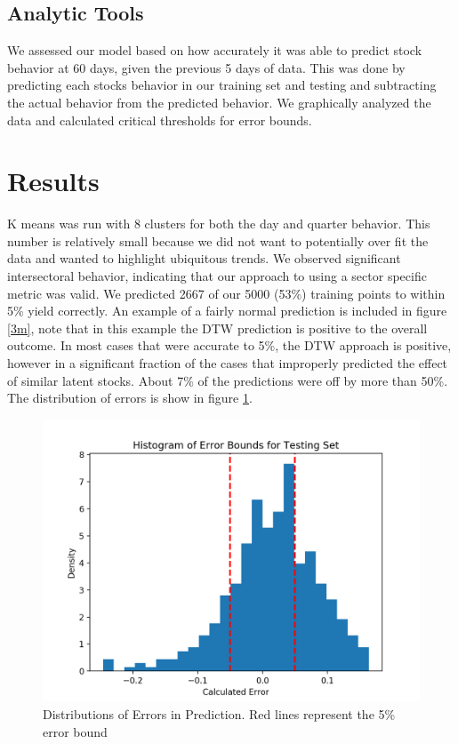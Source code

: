 \documentclass{article}
\begin{document}
\subsection{Analytic Tools}
We assessed our model based on how accurately it was able to predict stock behavior at 60 days, given the previous 5 days of data. This was done by predicting each stocks behavior in our training set and testing and subtracting the actual behavior from the predicted behavior. We graphically analyzed the data and calculated critical thresholds for error bounds. 

\section{Results}

K means was run with 8 clusters for both the day and quarter behavior. This number is relatively small because we did not want to potentially over fit the data and wanted to highlight ubiquitous trends. We observed significant intersectoral behavior, indicating that our approach to using a sector specific metric was valid. We predicted 2667 of our 5000 (53\%) training points   to within 5\% yield correctly. An example of a fairly normal prediction is included in figure \ref{3m}, note that in this example the DTW prediction is positive to the overall outcome. In most cases that were accurate to 5\%, the DTW approach is positive, however in a significant fraction of the cases that improperly predicted the effect of similar latent stocks. About 7\% of the predictions were off by more than 50\%.  The distribution of errors is show in figure \ref{errors}. 
\begin{figure}[ht]
    \centering
    \includegraphics[width = .5\textwidth]{errors.png}
    \caption{Distributions of Errors in Prediction. Red lines represent the 5\% error bound}
    \label{errors}
\end{figure}
\end{document}
